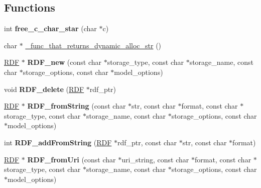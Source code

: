 \subsection*{Functions}
\begin{DoxyCompactItemize}
\item 
\mbox{\label{namespaceomexmeta_abd7043e0483a7393bd76a7469580d555}} 
int {\bfseries free\+\_\+c\+\_\+char\+\_\+star} (char $\ast$c)
\item 
char $\ast$ \hyperlink{namespaceomexmeta_a1d7bca5e4a24d7482048bd28d901e502}{\+\_\+func\+\_\+that\+\_\+returns\+\_\+dynamic\+\_\+alloc\+\_\+str} ()
\item 
\mbox{\label{namespaceomexmeta_ad25c02c4a271f0b7c5585d0cb241f102}} 
\hyperlink{classomexmeta_1_1RDF}{R\+DF} $\ast$ {\bfseries R\+D\+F\+\_\+new} (const char $\ast$storage\+\_\+type, const char $\ast$storage\+\_\+name, const char $\ast$storage\+\_\+options, const char $\ast$model\+\_\+options)
\item 
\mbox{\label{namespaceomexmeta_aa9f83a736bf28d204b9f485f09e59c59}} 
void {\bfseries R\+D\+F\+\_\+delete} (\hyperlink{classomexmeta_1_1RDF}{R\+DF} $\ast$rdf\+\_\+ptr)
\item 
\mbox{\label{namespaceomexmeta_a3df47da280fd76301f4db3ff70225457}} 
\hyperlink{classomexmeta_1_1RDF}{R\+DF} $\ast$ {\bfseries R\+D\+F\+\_\+from\+String} (const char $\ast$str, const char $\ast$format, const char $\ast$storage\+\_\+type, const char $\ast$storage\+\_\+name, const char $\ast$storage\+\_\+options, const char $\ast$model\+\_\+options)
\item 
\mbox{\label{namespaceomexmeta_a81b2c4407acfd8c80be70cb0ab34c8dc}} 
int {\bfseries R\+D\+F\+\_\+add\+From\+String} (\hyperlink{classomexmeta_1_1RDF}{R\+DF} $\ast$rdf\+\_\+ptr, const char $\ast$str, const char $\ast$format)
\item 
\mbox{\label{namespaceomexmeta_abb12dce1dc0ca915b778843360ff6844}} 
\hyperlink{classomexmeta_1_1RDF}{R\+DF} $\ast$ {\bfseries R\+D\+F\+\_\+from\+Uri} (const char $\ast$uri\+\_\+string, const char $\ast$format, const char $\ast$storage\+\_\+type, const char $\ast$storage\+\_\+name, const char $\ast$storage\+\_\+options, const char $\ast$model\+\_\+options)

\end{DoxyCompactItemize}
